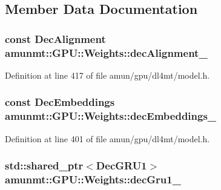 \subsection{Member Data Documentation}
\subsubsection[{\texorpdfstring{dec\+Alignment\+\_\+}{decAlignment_}}]{\setlength{\rightskip}{0pt plus 5cm}const {\bf Dec\+Alignment} amunmt\+::\+G\+P\+U\+::\+Weights\+::dec\+Alignment\+\_\+}\hypertarget{structamunmt_1_1GPU_1_1Weights_ae42172415ad97ecd7f25f4038ee1e7ec}{}\label{structamunmt_1_1GPU_1_1Weights_ae42172415ad97ecd7f25f4038ee1e7ec}


Definition at line 417 of file amun/gpu/dl4mt/model.\+h.

\subsubsection[{\texorpdfstring{dec\+Embeddings\+\_\+}{decEmbeddings_}}]{\setlength{\rightskip}{0pt plus 5cm}const {\bf Dec\+Embeddings} amunmt\+::\+G\+P\+U\+::\+Weights\+::dec\+Embeddings\+\_\+}\hypertarget{structamunmt_1_1GPU_1_1Weights_ad38dafd4e5728942b6cda10bacefdf90}{}\label{structamunmt_1_1GPU_1_1Weights_ad38dafd4e5728942b6cda10bacefdf90}


Definition at line 401 of file amun/gpu/dl4mt/model.\+h.

\subsubsection[{\texorpdfstring{dec\+Gru1\+\_\+}{decGru1_}}]{\setlength{\rightskip}{0pt plus 5cm}std\+::shared\+\_\+ptr$<${\bf Dec\+G\+R\+U1}$>$ amunmt\+::\+G\+P\+U\+::\+Weights\+::dec\+Gru1\+\_\+}\hypertarget{structamunmt_1_1GPU_1_1Weights_ac3c477a5126a38078a9f824cce574ae2}{}\label{structamunmt_1_1GPU_1_1Weights_ac3c477a5126a38078a9f824cce574ae2}


